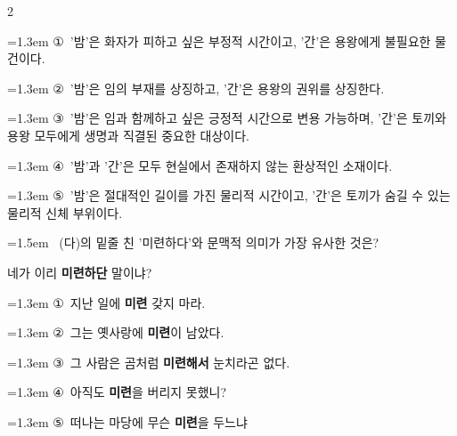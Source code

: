 \documentclass[10pt, a4paper]{article}
\begin{document}
\begin{multicols}{2}
\begin{minipage}{\columnwidth}
\vspace{0.5mm}
{\hangindent=1.3em  \noindent\hspace{0.3em}①~'밤'은 화자가 피하고 싶은 부정적 시간이고, '간'은 용왕에게 불필요한 물건이다.\par}
{\hangindent=1.3em  \noindent\hspace{0.3em}②~'밤'은 임의 부재를 상징하고, '간'은 용왕의 권위를 상징한다.\par}
{\hangindent=1.3em  \noindent\hspace{0.3em}③~'밤'은 임과 함께하고 싶은 긍정적 시간으로 변용 가능하며, '간'은 토끼와 용왕 모두에게 생명과 직결된 중요한 대상이다.\par}
{\hangindent=1.3em  \noindent\hspace{0.3em}④~'밤'과 '간'은 모두 현실에서 존재하지 않는 환상적인 소재이다.\par}
{\hangindent=1.3em  \noindent\hspace{0.3em}⑤~'밤'은 절대적인 길이를 가진 물리적 시간이고, '간'은 토끼가 숨길 수 있는 물리적 신체 부위이다.\par}
\vspace{4mm}
\end{minipage}
\par

\noindent\begin{minipage}{\columnwidth}
\vspace{2mm}
{\hangindent=1.5em  ~(다)의 밑줄 친 '미련하다'와 문맥적 의미가 가장 유사한 것은?\par}

\vspace{1mm}
\begin{boxibox}
네가 이리 \textbf{미련하단} 말이냐? \\
\end{boxibox}
\vspace{1mm}

\vspace{0.5mm}
{\hangindent=1.3em  \noindent\hspace{0.3em}①~지난 일에 \textbf{미련} 갖지 마라.\par}
{\hangindent=1.3em  \noindent\hspace{0.3em}②~그는 옛사랑에 \textbf{미련}이 남았다.\par}
{\hangindent=1.3em  \noindent\hspace{0.3em}③~그 사람은 곰처럼 \textbf{미련해서} 눈치라곤 없다.\par}
{\hangindent=1.3em  \noindent\hspace{0.3em}④~아직도 \textbf{미련}을 버리지 못했니?\par}
{\hangindent=1.3em  \noindent\hspace{0.3em}⑤~떠나는 마당에 무슨 \textbf{미련}을 두느냐\par}
\vspace{4mm}
\end{minipage}
\par


\end{multicols}
\end{document}

